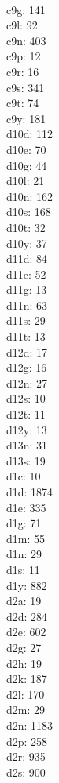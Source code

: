 \begin{multicols}{8}
  \\c9g: 141
  \\c9l: 92
  \\c9n: 403
  \\c9p: 12
  \\c9r: 16
  \\c9s: 341
  \\c9t: 74
  \\c9y: 181
  \\d10d: 112
  \\d10e: 70
  \\d10g: 44
  \\d10l: 21
  \\d10n: 162
  \\d10s: 168
  \\d10t: 32
  \\d10y: 37
  \\d11d: 84
  \\d11e: 52
  \\d11g: 13
  \\d11n: 63
  \\d11s: 29
  \\d11t: 13
  \\d12d: 17
  \\d12g: 16
  \\d12n: 27
  \\d12s: 10
  \\d12t: 11
  \\d12y: 13
  \\d13n: 31
  \\d13s: 19
  \\d1c: 10
  \\d1d: 1874
  \\d1e: 335
  \\d1g: 71
  \\d1m: 55
  \\d1n: 29
  \\d1s: 11
  \\d1y: 882
  \\d2a: 19
  \\d2d: 284
  \\d2e: 602
  \\d2g: 27
  \\d2h: 19
  \\d2k: 187
  \\d2l: 170
  \\d2m: 29
  \\d2n: 1183
  \\d2p: 258
  \\d2r: 935
  \\d2s: 900

\end{multicols}
